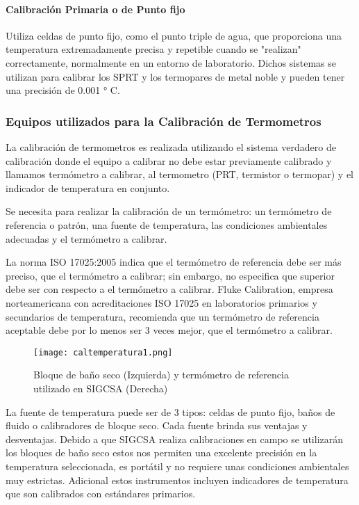 \paragraph{Calibración Primaria o de Punto fijo} 
Utiliza celdas de punto fijo, como el punto triple de agua, que proporciona una temperatura extremadamente precisa y repetible cuando se "realizan" correctamente, normalmente en un entorno de laboratorio. Dichos sistemas se utilizan para calibrar los SPRT y los termopares de metal noble y pueden tener una precisión de 0.001 ° C.

\subsubsection{Equipos utilizados para la Calibración de Termometros}

\par 
La calibración de termometros es realizada utilizando el sistema verdadero de calibración donde el equipo a calibrar no debe estar previamente calibrado y llamamos termómetro a calibrar, al termometro (PRT, termistor o termopar) y el indicador de temperatura en conjunto.

\par \noindent
Se necesita para realizar la calibración de un termómetro: un termómetro de referencia o patrón, una fuente de temperatura, las condiciones ambientales adecuadas y el termómetro a calibrar.

\par \noindent
La norma ISO 17025:2005 indica que el termómetro de referencia debe ser más preciso, que el termómetro a calibrar; sin embargo, no especifica que superior debe ser con respecto a el termómetro a calibrar. Fluke Calibration, empresa norteamericana con acreditaciones ISO 17025 en laboratorios primarios y secundarios de temperatura, recomienda que un termómetro de referencia aceptable debe por lo menos ser 3 veces mejor, que el termómetro a calibrar.

\begin{figure}[H]
	\centering
	\texttt{[image: caltemperatura1.png]}
	\caption{Bloque de baño seco (Izquierda) y termómetro de referencia utilizado en SIGCSA (Derecha)}
\end{figure}

\par \noindent
La fuente de temperatura puede ser de 3 tipos: celdas de punto fijo, baños de fluido o calibradores de bloque seco.
Cada fuente brinda sus ventajas y desventajas. Debido a que SIGCSA realiza calibraciones en campo se utilizarán los bloques de baño seco estos nos permiten una excelente precisión en la temperatura seleccionada, es portátil y no requiere unas condiciones ambientales muy estrictas.
Adicional estos instrumentos incluyen indicadores de temperatura que son calibrados con estándares primarios.

